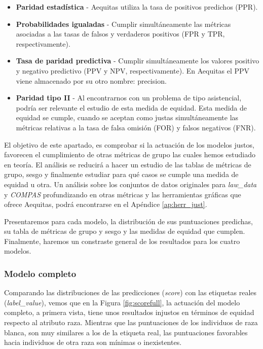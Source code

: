 \documentclass[oneside,openright,titlepage,numbers=noenddot,openany,headinclude,footinclude=true,
cleardoublepage=empty,abstractoff,BCOR=5mm,paper=a4,fontsize=12pt,main=spanish]{scrreprt}
\begin{document}
\begin{itemize}
    \item \textbf{Paridad estadística} - Aequitas utiliza la tasa de positivos predichos (PPR).
    \item \textbf{Probabilidades igualadas} - Cumplir simultáneamente las métricas asociadas a las tasas de falsos y verdaderos positivos (FPR y TPR, respectivamente).
    \item \textbf{Tasa de paridad predictiva} - Cumplir simultáneamente los valores positivo y negativo predictivo (PPV y NPV, respectivamente). En Aequitas el PPV viene almacenado por su otro nombre: precision.
    \clearpage
    \item \textbf{Paridad tipo II} - Al encontrarnos con un problema de tipo asistencial, podría ser relevante el estudio de esta medida de equidad. Esta medida de equidad se cumple, cuando se aceptan como justas simultáneamente las métricas relativas a la tasa de falsa omisión (FOR) y falsos negativos (FNR).
\end{itemize}

El objetivo de este apartado, es comprobar si la actuación de los modelos justos, favorecen el cumplimiento de otras métricas de grupo las cuales hemos estudiado en teoría. El análisis se reducirá a hacer un estudio de las tablas de métricas de grupo, sesgo y finalmente estudiar para qué casos se cumple una medida de equidad u otra. Un análisis sobre los conjuntos de datos originales para \textit{law\_data} y \textit{COMPAS} profundizando en otras métricas y las herramientas gráficas que ofrece Aequitas, podrá encontrarse en el Apéndice \ref{ap:herr_just}.

Presentaremos para cada modelo, la distribución de sus puntuaciones predichas, su tabla de métricas de grupo y sesgo y las medidas de equidad que cumplen. Finalmente, haremos un constraste general de los resultados para los cuatro modelos.

\subsubsection*{Modelo completo}

Comparando las distribuciones de las predicciones (\textit{score}) con las etiquetas reales (\textit{label\_value}), vemos que en la Figura \ref{fig:scorefull}, la actuación del modelo completo, a primera vista, tiene unos resultados injustos en términos de equidad respecto al atributo raza. Mientras que las puntuaciones de los individuos de raza blanca, son muy similares a los de la etiqueta real, las puntuaciones favorables hacia individuos de otra raza son mínimas o inexistentes.\\
\end{document}
